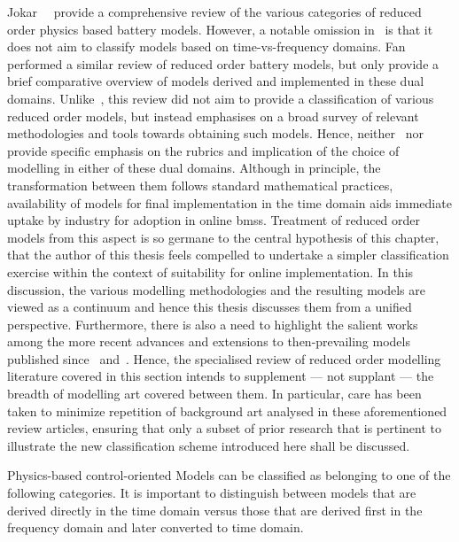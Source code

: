 Jokar~\etal~\cite{Jokar2016}  provide  a  comprehensive review  of  the  various
categories of  reduced order  physics based battery  models. However,  a notable
omission  in~\cite{Jokar2016}  is  that  it  does not  aim  to  classify  models
based  on  time-vs-frequency  domains.  Fan~\etal{}~\cite{Fan2015}  performed  a
similar  review of  reduced  order  battery models,  but  only  provide a  brief
comparative overview  of models derived  and implemented in these  dual domains.
Unlike~\cite{Jokar2016}, this review did not  aim to provide a classification of
various  reduced  order  models,  but  instead  emphasises  on  a  broad  survey
of  relevant  methodologies and  tools  towards  obtaining such  models.  Hence,
neither~\cite{Jokar2016}  nor~\cite{Fan2015} provide  specific  emphasis on  the
rubrics  and implication  of the  choice of  modelling in  either of  these dual
domains. Although in principle, the transformation between them follows standard
mathematical  practices,~  availability of  models for
final implementation  in the time domain  aids immediate uptake by  industry for
adoption  in online  \gls{bms}s. Treatment  of  reduced order  models from  this
aspect  is  so germane  to  the  central  hypothesis of  this  chapter,  that  the  author of  this  thesis
feels  compelled  to undertake  a  simpler  classification exercise  within  the
context  of  suitability for  online  implementation.  In this  discussion,  the
various  modelling  methodologies and  the  resulting  models  are viewed  as  a
continuum  and hence  this thesis  discusses  them from  a unified  perspective.
Furthermore,  there  is  also  a  need to  highlight  the  salient  works  among
the  more recent  advances and  extensions to  then-prevailing models  published
since~\cite{Jokar2016}  and~\cite{Fan2015}.  Hence,  the specialised  review  of
reduced order modelling literature covered in this section intends to supplement
---  not supplant  --- the  breadth of  modelling art  covered between  them. In
particular,  care  has been  taken  to  minimize  repetition of  background  art
analysed in these aforementioned review articles, ensuring that only a subset of
prior research  that is  pertinent to illustrate  the new  classification scheme
introduced here shall be discussed.

Physics-based control-oriented Models  can be classified as belonging  to one of
the following categories. It
is important to distinguish between models that are derived directly in the time
domain versus  those that are  derived first in  the frequency domain  and later
converted to time domain.

